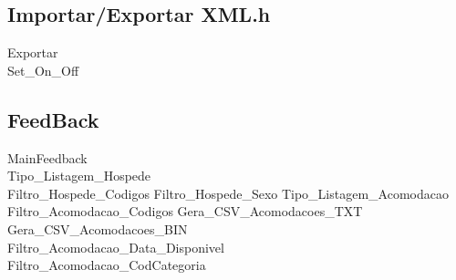 \documentclass[titlepage]{article}
\begin{document}
	\subsection{Importar/Exportar XML.h}
	Exportar\\
	Set\_On\_Off\\

	
	\subsection{FeedBack}
	MainFeedback\\
	Tipo\_Listagem\_Hospede\\
	Filtro\_Hospede\_Codigos	
	Filtro\_Hospede\_Sexo	
	Tipo\_Listagem\_Acomodacao\\
	Filtro\_Acomodacao\_Codigos	
	Gera\_CSV\_Acomodacoes\_TXT\\
	Gera\_CSV\_Acomodacoes\_BIN\\
	Filtro\_Acomodacao\_Data\_Disponivel\\
	Filtro\_Acomodacao\_CodCategoria\\
































				
	
\end{document}
